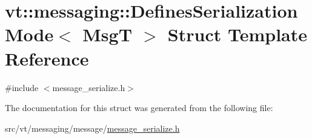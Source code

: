 \hypertarget{structvt_1_1messaging_1_1_defines_serialization_mode}{}\section{vt\+:\+:messaging\+:\+:Defines\+Serialization\+Mode$<$ MsgT $>$ Struct Template Reference}
\label{structvt_1_1messaging_1_1_defines_serialization_mode}


{\ttfamily \#include $<$message\+\_\+serialize.\+h$>$}



The documentation for this struct was generated from the following file\+:\begin{DoxyCompactItemize}
\item 
src/vt/messaging/message/\hyperlink{message__serialize_8h}{message\+\_\+serialize.\+h}\end{DoxyCompactItemize}
